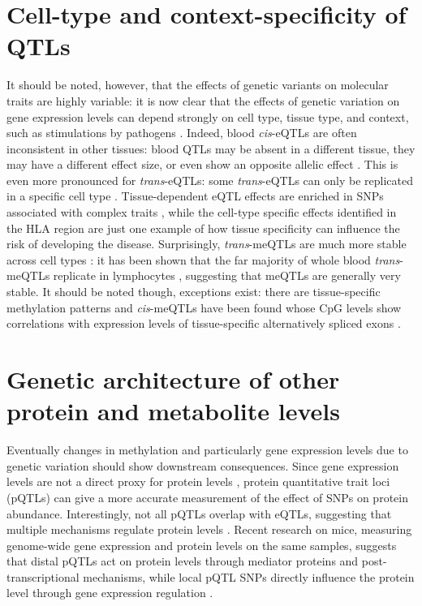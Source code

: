 \section{Cell-type and context-specificity of QTLs}
It should be noted, however, that the effects of genetic variants on molecular traits are highly variable: it is now clear that the effects of genetic variation on gene expression levels can depend strongly on cell type, tissue type, and context, such as stimulations by pathogens \cite{fuUnravelingRegulatoryMechanisms2012,gat-viksDecipheringMolecularCircuits2013,fairfaxInnateImmuneActivity2014,leeCommonGeneticVariants2014,meleHumanTranscriptomeTissues2015}. Indeed, blood \emph{cis}-eQTLs are often inconsistent in other tissues: blood QTLs may be absent in a different tissue, they may have a different effect size, or even show an opposite allelic effect \cite{fuUnravelingRegulatoryMechanisms2012}. This is even more pronounced for \emph{trans}-eQTLs: some \emph{trans}-eQTLs can only be replicated in a specific cell type \cite{westraSystematicIdentificationTrans2013}. Tissue-dependent eQTL effects are enriched in SNPs associated with complex traits \cite{fuUnravelingRegulatoryMechanisms2012}, while the cell-type specific effects identified in the HLA region \cite{fairfaxGeneticsGeneExpression2012} are just one example of how tissue specificity can influence the risk of developing the disease. Surprisingly, \emph{trans}-meQTLs are much more stable across cell types \cite{gutierrez-arcelusTissueSpecificEffectsGenetic2015}: it has been shown that the far majority of whole blood \emph{trans}-meQTLs replicate in lymphocytes \cite{bonderDiseaseVariantsAlter2017}, suggesting that meQTLs are generally very stable. It should be noted though, exceptions exist: there are tissue-specific methylation patterns \cite{lokkDNAMethylomeProfiling2014} and \emph{cis}-meQTLs have been found whose CpG levels show correlations with expression levels of tissue-specific alternatively spliced exons \cite{gutierrez-arcelusTissueSpecificEffectsGenetic2015}.

\section{Genetic architecture of other protein and metabolite levels}
Eventually changes in methylation and particularly gene expression levels due to genetic variation should show downstream consequences. Since gene expression levels are not a direct proxy for protein levels \cite{partsHeritabilityGeneticBasis2014,liuInterdependenceTranscriptProtein2016}, protein quantitative trait loci (pQTLs) can give a more accurate measurement of the effect of SNPs on protein abundance. Interestingly, not all pQTLs overlap with eQTLs, suggesting that multiple mechanisms regulate protein levels \cite{wuVariationGeneticControl2013,liuQuantitativeVariability3422015}. Recent research on mice, measuring genome-wide gene expression and protein levels on the same samples, suggests that distal pQTLs act on protein levels through mediator proteins and post-transcriptional mechanisms, while local pQTL SNPs directly influence the protein level through gene expression regulation \cite{chickDefiningConsequencesGenetic2016}. 

